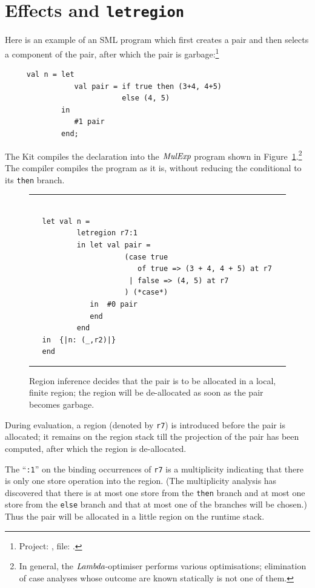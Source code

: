\documentclass[12pt]{book}
\begin{document}
\section{Effects and {\tt letregion}}
\label{effects.sec}
Here is an example of an SML program which first creates a pair and
then selects a component of the pair, after which the pair is garbage:\footnote{Project: , 
file: .}
\begin{verbatim}
     val n = let 
                val pair = if true then (3+4, 4+5) 
                           else (4, 5)
             in 
                #1 pair
             end;
\end{verbatim}
The Kit compiles the declaration into the 
$\hbox{\it MulExp}$ program shown in Figure~\ref{elimpair.fig}.\footnote{
In general, the $\hbox{\it Lambda}$-optimiser performs various optimisations;
elimination of case analyses whose outcome are known statically
is not one of them.}
The compiler compiles the program as it is, without reducing the conditional
to its {\tt then} branch.
\begin{figure}
\hrule
\begin{verbatim}

   let val n = 
           letregion r7:1 
           in let val pair = 
                      (case true 
                         of true => (3 + 4, 4 + 5) at r7 
                       | false => (4, 5) at r7
                      ) (*case*) 
              in  #0 pair
              end  
           end
   in  {|n: (_,r2)|}
   end 
\end{verbatim}
\caption{Region inference decides that the 
pair is to be allocated in a local, finite region; the region will be de-allocated
as soon as the pair becomes garbage.}
\medskip

\hrule
\label{elimpair.fig}
\end{figure}
During evaluation, a region (denoted by {\tt r7}) 
is introduced before the pair is allocated;
it remains on the region stack till the projection of the pair
has been computed, after which the region is de-allocated. 

The ``{\tt :1}'' on the binding occurrences of {\tt r7}
is a multiplicity indicating that there is only one store
operation into the region. (The multiplicity analysis
has discovered that there is at most one store from the {\tt then}
branch and at most one store from the {\tt else} branch and that
at most one of the branches will be chosen.) Thus the pair will be
allocated in a little region on the runtime stack.
\end{document}
